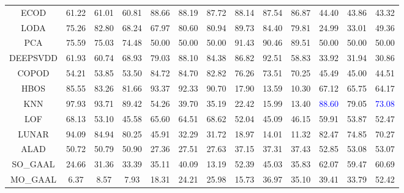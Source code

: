 \begin{table}[!ht]
{\begin{tabular}{|c|ccc|ccc|ccc|ccc|}
ECOD & 61.22 & 61.01 & 60.81 & 88.66 & 88.19 & 87.72 & 88.14 & 87.54 & 86.87 & 44.40 & 43.86 & 43.32 \\
LODA & 75.26 & 82.80 & 68.24 & 67.97 & 80.60 & 80.94 & 89.73 & 84.40 & 79.81 & 24.99 & 33.01 & 49.36 \\
PCA & 75.59 & 75.03 & 74.48 & 50.00 & 50.00 & 50.00 & 91.43 & 90.46 & 89.51 & 50.00 & 50.00 & 50.00 \\
DEEPSVDD & 61.93 & 60.74 & 68.93 & 79.03 & 88.10 & 84.38 & 86.82 & 92.51 & 58.83 & 33.92 & 31.94 & 30.86 \\
COPOD & 54.21 & 53.85 & 53.50 & 84.72 & 84.70 & 82.82 & 76.26 & 73.51 & 70.25 & 45.49 & 45.00 & 44.51 \\
HBOS & 85.55 & 83.26 & 81.66 & 93.37 & 92.33 & 90.70 & 17.90 & 13.59 & 10.30 & 67.12 & 65.75 & 64.17 \\
KNN & 97.93 & 93.71 & 89.42 & 54.26 & 39.70 & 35.19 & 22.42 & 15.99 & 13.40 & \textcolor{blue}{88.60} & 79.05 & \textcolor{blue}{73.08} \\
LOF & 68.13 & 53.10 & 45.58 & 65.60 & 64.51 & 68.62 & 52.04 & 45.09 & 46.15 & 59.91 & 53.87 & 52.47 \\
LUNAR & 94.09 & 84.94 & 80.25 & 45.91 & 32.29 & 31.72 & 18.97 & 14.01 & 11.32 & 82.47 & 74.85 & 70.27 \\
ALAD & 50.72 & 50.79 & 50.90 & 27.36 & 27.51 & 27.63 & 37.15 & 37.31 & 37.43 & 52.85 & 53.08 & 53.07 \\
SO\_GAAL & 24.66 & 31.36 & 33.39 & 35.11 & 40.09 & 13.19 & 52.39 & 45.03 & 35.83 & 62.07 & 59.47 & 60.69 \\
MO\_GAAL & 6.37 & 8.57 & 7.93 & 18.31 & 24.21 & 25.98 & 15.73 & 36.97 & 35.10 & 39.41 & 33.79 & 52.42 \\
\hline
\end{tabular}
}
\label{tab:model_noise_perf}
\end{table}
